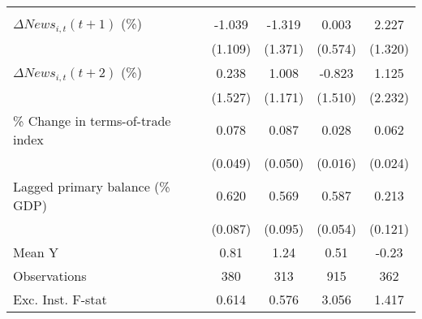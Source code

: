 {\begin{tabular}{l*{4}{c}}
                    &                     &                     &                     &                     \\
\addlinespace
$ \Delta News_{i,t}(t+1)$ (\%)&      -1.039         &      -1.319         &       0.003         &       2.227\sym{*}  \\
                    &     (1.109)         &     (1.371)         &     (0.574)         &     (1.320)         \\
\addlinespace
$ \Delta News_{i,t}(t+2)$ (\%)&       0.238         &       1.008         &      -0.823         &       1.125         \\
                    &     (1.527)         &     (1.171)         &     (1.510)         &     (2.232)         \\
\addlinespace
\% Change in terms-of-trade index&       0.078         &       0.087\sym{*}  &       0.028\sym{*}  &       0.062\sym{***}\\
                    &     (0.049)         &     (0.050)         &     (0.016)         &     (0.024)         \\
\addlinespace
Lagged primary balance (\% GDP)&       0.620\sym{***}&       0.569\sym{***}&       0.587\sym{***}&       0.213\sym{*}  \\
                    &     (0.087)         &     (0.095)         &     (0.054)         &     (0.121)         \\
\midrule
Mean Y              &        0.81         &        1.24         &        0.51         &       -0.23         \\
Observations        &         380         &         313         &         915         &         362         \\
Exc. Inst. F-stat   &       0.614         &       0.576         &       3.056         &       1.417         \\
\bottomrule
\end{tabular}
}
